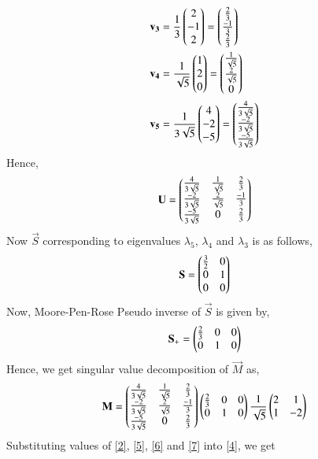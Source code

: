 \documentclass[journal,12pt,twocolumn]{IEEEtran}
\begin{document}
\begin{align}
	& \mathbf{v_3} = \frac{1}{3}\begin{pmatrix}2 \\ -1 \\ 2\end{pmatrix} = \begin{pmatrix}\frac{2}{3} \\ \frac{-1}{3} \\ \frac{2}{3}\end{pmatrix} \\
	& \mathbf{v_4} = \frac{1}{\sqrt{5}}\begin{pmatrix}1 \\ 2 \\ 0\end{pmatrix} = \begin{pmatrix}\frac{1}{\sqrt{5}} \\ \frac{2}{\sqrt{5}} \\ 0\end{pmatrix} \\ 
	& \mathbf{v_5} = \frac{1}{3\sqrt{5}}\begin{pmatrix}4 \\ -2 \\ -5\end{pmatrix} =  \begin{pmatrix}\frac{4}{3\sqrt{5}} \\ \frac{-2}{3\sqrt{5}} \\ \frac{-5}{3\sqrt{5}}\end{pmatrix}
\end{align}
Hence,
\begin{align}
	\mathbf{U} = \begin{pmatrix}\frac{4}{3\sqrt{5}} & \frac{1}{\sqrt{5}} & \frac{2}{3} \\ \frac{-2}{3\sqrt{5}}  & \frac{2}{\sqrt{5}} & \frac{-1}{3} \\ \frac{-5}{3\sqrt{5}}  & 0 & \frac{2}{3} \end{pmatrix} \label{6}
\end{align}
Now $\vec{S}$ corresponding to eigenvalues $\lambda_5$, $\lambda_4$ and $\lambda_3$ is as follows,
\begin{align}
\mathbf{S} = \begin{pmatrix}\frac{3}{2} & 0 \\ 0 & 1 \\ 0 & 0\end{pmatrix}\label{7}
\end{align}
Now, Moore-Pen-Rose Pseudo inverse of $\vec{S}$ is given by,
\begin{align}
\mathbf{S_+} = \begin{pmatrix}\frac{2}{3} & 0 & 0 \\ 0 & 1 & 0\end{pmatrix}
\end{align}
Hence, we get singular value decomposition of $\vec{M}$ as,
\begin{align}
\mathbf{M} = \begin{pmatrix}\frac{4}{3\sqrt{5}} & \frac{1}{\sqrt{5}} & \frac{2}{3} \\ \frac{-2}{3\sqrt{5}}  & \frac{2}{\sqrt{5}} & \frac{-1}{3} \\ \frac{-5}{3\sqrt{5}}  & 0 & \frac{2}{3} \end{pmatrix} \begin{pmatrix}\frac{2}{3} & 0 & 0 \\ 0 & 1 & 0\end{pmatrix} \frac{1}{\sqrt{5}}\begin{pmatrix}2 & 1 \\ 1 & -2 \end{pmatrix}
\end{align}
Substituting values of \eqref{2}, \eqref{5}, \eqref{6} and \eqref{7} into \eqref{4}, we get
\end{document}
